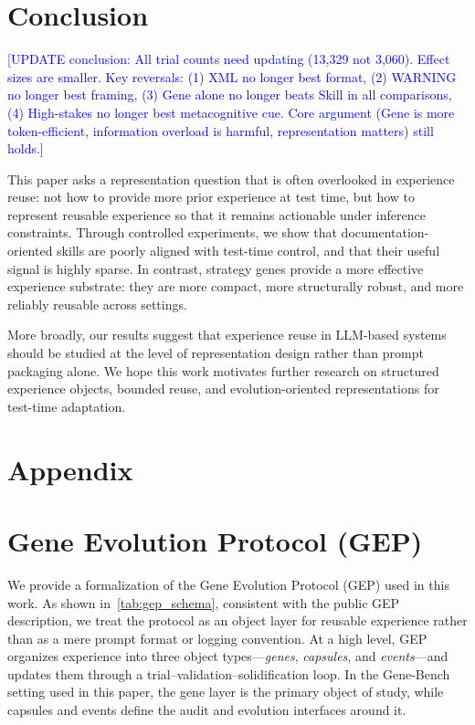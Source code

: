 \documentclass{article}
\newcommand{\blue}[1]{\textcolor{blue}{#1}}
\begin{document}
\section{Conclusion}
\label{sec:conclusion}

\blue{[UPDATE conclusion: All trial counts need updating (13,329 not 3,060). Effect sizes are smaller. Key reversals: (1) XML no longer best format, (2) WARNING no longer best framing, (3) Gene alone no longer beats Skill in all comparisons, (4) High-stakes no longer best metacognitive cue. Core argument (Gene is more token-efficient, information overload is harmful, representation matters) still holds.]}

This paper asks a representation question that is often overlooked in experience reuse: not how to provide more prior experience at test time, but how to represent reusable experience so that it remains actionable under inference constraints.
Through controlled experiments, we show that documentation-oriented skills are poorly aligned with test-time control, and that their useful signal is highly sparse.
In contrast, strategy genes provide a more effective experience substrate: they are more compact, more structurally robust, and more reliably reusable across settings.

More broadly, our results suggest that experience reuse in LLM-based systems should be studied at the level of representation design rather than prompt packaging alone.
We hope this work motivates further research on structured experience objects, bounded reuse, and evolution-oriented representations for test-time adaptation.

{


}

\clearpage
\appendix
\section*{Appendix}

\section{Gene Evolution Protocol (GEP)}
\label{app:gep}



We provide a formalization of the Gene Evolution Protocol (GEP) used in this work. 
As shown in~\cref{tab:gep_schema}, consistent with the public GEP description, we treat the protocol as an object layer for reusable experience rather than as a mere prompt format or logging convention. 
At a high level, GEP organizes experience into three object types---\emph{genes}, \emph{capsules}, and \emph{events}---and updates them through a trial--validation--solidification loop. 
In the Gene-Bench setting used in this paper, the gene layer is the primary object of study, while capsules and events define the audit and evolution interfaces around it.
\end{document}
